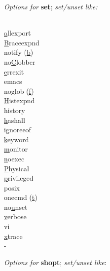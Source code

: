 \textit{Options for }\textbf{set}; \textit{set/unset like:}\\
\\
\vspace{-7mm}
{\footnotesize \begin{multicols*}{4}
    \ul{a}llexport \\
    \ul{B}raceexp\textquotesingle nd \\
    notify (\ul{b}) \\
    no\ul{C}lobber \\
    \ul{e}rrexit \\
    emacs \\
    noglob (\ul{f}) \\
    \ul{H}istexp\textquotesingle nd \\
    history \\
    \ul{h}ashall \\
    ignoreeof \\
    \ul{k}eyword \\
    \ul{m}onitor \\
    \ul{n}oexec \\
    \ul{P}hysical \\
    \ul{p}rivileged \\
    posix \\
    onecmd (\ul{t}) \\
    no\ul{u}nset \\
    \ul{v}erbose \\
    vi \\
    \ul{x}trace \\
    - \\
\end{multicols*}}


\textit{Options for }\textbf{shopt}; \textit{ set/unset like}:\\
\\

